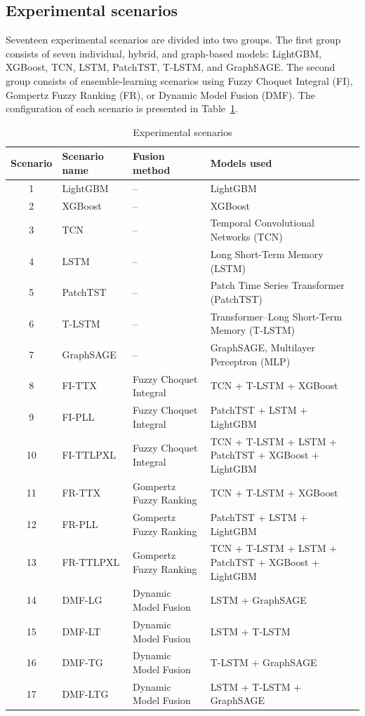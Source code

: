 \documentclass[10pt,twoside]{article}
\begin{document}
\subsection{Experimental scenarios}

Seventeen experimental scenarios are divided into two groups. The first group consists of seven individual, hybrid, and graph-based models: LightGBM, XGBoost, TCN, LSTM, PatchTST, T-LSTM, and GraphSAGE. The second group consists of ensemble-learning scenarios using Fuzzy Choquet Integral (FI), Gompertz Fuzzy Ranking (FR), or Dynamic Model Fusion (DMF). The configuration of each scenario is presented in Table~\ref{tab:experimental_scenarios}.

\begingroup
\centering
\begin{longtable}{c l l >{\raggedright\arraybackslash}p{6.5cm}}
\caption{Experimental scenarios}
\label{tab:experimental_scenarios}\\
\hline 
\textbf{Scenario} & \textbf{Scenario name} & \textbf{Fusion method} & \textbf{Models used} \\ \hline 
1 & LightGBM & -- & LightGBM \\ 
2 & XGBoost & -- & XGBoost \\ 
3 & TCN & -- & Temporal Convolutional Networks (TCN) \\ 
4 & LSTM & -- & Long Short-Term Memory (LSTM) \\ 
5 & PatchTST & -- & Patch Time Series Transformer (PatchTST) \\ 
6 & T-LSTM & -- & Transformer--Long Short-Term Memory (T-LSTM) \\ 
7 & GraphSAGE & -- & GraphSAGE, Multilayer Perceptron (MLP) \\ 
8 & FI-TTX & Fuzzy Choquet Integral & TCN + T-LSTM + XGBoost \\ 
9 & FI-PLL & Fuzzy Choquet Integral & PatchTST + LSTM + LightGBM \\ 
10 & FI-TTLPXL & Fuzzy Choquet Integral & TCN + T-LSTM + LSTM + PatchTST + XGBoost + LightGBM \\ 
11 & FR-TTX & Gompertz Fuzzy Ranking & TCN + T-LSTM + XGBoost \\ 
12 & FR-PLL & Gompertz Fuzzy Ranking & PatchTST + LSTM + LightGBM \\ 
13 & FR-TTLPXL & Gompertz Fuzzy Ranking & TCN + T-LSTM + LSTM + PatchTST + XGBoost + LightGBM \\ 
14 & DMF-LG & Dynamic Model Fusion & LSTM + GraphSAGE \\ 
15 & DMF-LT & Dynamic Model Fusion & LSTM + T-LSTM \\ 
16 & DMF-TG & Dynamic Model Fusion & T-LSTM + GraphSAGE \\
17 & DMF-LTG & Dynamic Model Fusion & LSTM + T-LSTM + GraphSAGE \\ \hline
\end{longtable}
\endgroup
\end{document}

